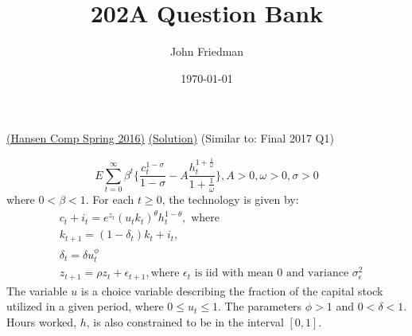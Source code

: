 \documentclass[answers]{exam}
\title{202A Question Bank}
\author{John Friedman}
\date{\today}
\begin{document}
\maketitle

\begin{questions}
 
    \question \href{https://economics.ucla.edu/wp-content/uploads/2016/10/macro-f16.pdf}{(Hansen Comp Spring 2016)}
    \href{https://drive.google.com/file/u/3/d/1I_XVSpJZWsAtp4uIZizpPaIZk6EHggCC/view?usp=drive_open}{(Solution)}
    (Similar to: Final 2017 Q1)

    $$E \sum_{t=0}^{\infty} \beta^t \{\frac{c_t^{1-\sigma}}{1-\sigma} - A \frac{h_t^{1+\frac{1}{\omega}}}{1+ \frac{1}{\omega}}\}, A> 0, \omega > 0, \sigma > 0$$
    where $0 < \beta < 1$. For each $t \geq 0$, the technology is given by:
    \begin{align*}
        &c_t + i_t = e^{z_t} (u_t k_t)^{\theta} h_t^{1-\theta}, \text{ where}\\
        &k_{t+1} = (1-\delta_t) k_t + i_t,\\
        &\delta_t = \delta u_t^\phi\\
        &z_{t+1} = \rho z_t + \epsilon_{t+1}, \text{where $\epsilon_{t}$ is iid with mean 0 and variance $\sigma_{\epsilon}^2$}
    \end{align*}
    The variable $u$ is a choice variable describing the fraction of the capital stock utilized in a given period, where $0 \leq u_t \leq 1$. The parameters $\phi > 1$ and $0 < \delta < 1$. Hours worked, $h$, is also constrained to be in the interval $[0,1]$.
\end{questions}
\end{document}
